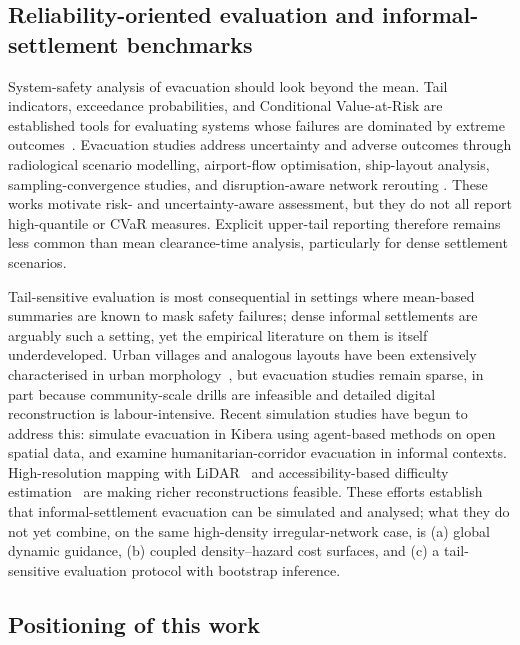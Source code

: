 \documentclass[preprint,12pt]{elsarticle}
\providecommand{\FloatBarrier}{}
\let\origsubsection\subsection
\renewcommand{\subsection}{\FloatBarrier\origsubsection}
\begin{document}
\subsection{Reliability-oriented evaluation and informal-settlement
benchmarks}
\label{sec:rw_eval}

System-safety analysis of evacuation should look beyond the mean. Tail
indicators, exceedance probabilities, and Conditional Value-at-Risk are
established tools for evaluating systems whose failures are dominated by
extreme outcomes~\citep{Rockafellar2002CVaR}. Evacuation studies address
uncertainty and adverse outcomes through radiological scenario modelling,
airport-flow optimisation, ship-layout analysis, sampling-convergence
studies, and disruption-aware network rerouting
\citep{Kim2023RadiologicalEvac,Ma2024AirportPassengerFlow,Wang2022RoRoEvac,Lovreglio2019SamplingConvergence,Darvishan2021DynamicReroute}.
These works motivate risk- and uncertainty-aware assessment, but they do
not all report high-quantile or CVaR measures. Explicit upper-tail
reporting therefore remains less common than mean clearance-time analysis,
particularly for dense settlement scenarios.

Tail-sensitive evaluation is most consequential in settings where
mean-based summaries are known to mask safety failures; dense informal
settlements are arguably such a setting, yet the empirical literature on
them is itself underdeveloped. Urban villages and analogous layouts have
been extensively characterised in urban
morphology~\citep{Al2014Villages_UHPress,Lin2011GuangzhouVIC,cao2025mapping},
but evacuation studies remain sparse, in part because community-scale
drills are infeasible and detailed digital reconstruction is
labour-intensive. Recent simulation studies have begun to address this:
\citet{Butters2025Kibera} simulate evacuation in Kibera using
agent-based methods on open spatial data, and
\citet{Kuligowski2025Humanitarian} examine humanitarian-corridor
evacuation in informal contexts. High-resolution mapping with
LiDAR~\citep{Liu2025LiDARInformal} and accessibility-based difficulty
estimation~\citep{Liu2022EvacAccessibility} are making richer
reconstructions feasible. These efforts establish that
informal-settlement evacuation can be simulated and analysed; what they
do not yet combine, on the same high-density irregular-network case, is
(a) global dynamic guidance, (b) coupled density--hazard cost surfaces,
and (c) a tail-sensitive evaluation protocol with bootstrap inference.

\subsection{Positioning of this work}
\label{sec:rw_position}
\end{document}
